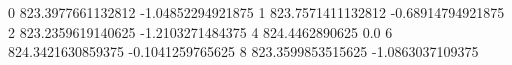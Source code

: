 0 823.3977661132812 -1.04852294921875
1 823.7571411132812 -0.68914794921875
2 823.2359619140625 -1.2103271484375
4 824.4462890625 0.0
6 824.3421630859375 -0.1041259765625
8 823.3599853515625 -1.0863037109375
